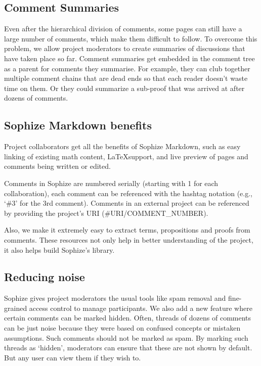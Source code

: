 \documentclass[a4paper]{article}
\begin{document}
\subsection{Comment Summaries}

Even after the hierarchical division of comments, some pages can still have a large number of comments, which make them difficult to follow. To overcome this problem, we allow project moderators to create summaries of discussions that have taken place so far. Comment summaries get embedded in the comment tree as a parent for comments they summarise. For example, they can club together multiple comment chains that are dead ends so that each reader doesn't waste time on them. Or they could summarize a sub-proof that was arrived at after dozens of comments.


\subsection{Sophize Markdown benefits}

Project collaborators get all the benefits of Sophize Markdown, such as easy linking of existing math content, \LaTeX\space support, and live preview of pages and comments being written or edited.


Comments in Sophize are numbered serially (starting with 1 for each collaboration), each comment can be referenced with the hashtag notation (e.g., `\#3' for the 3rd comment). Comments in an external project can be referenced by providing the project's URI (\#URI/COMMENT\_NUMBER).

Also, we make it extremely easy to extract terms, propositions and proofs from comments. These resources not only help in better understanding of the project, it also helps build Sophize's library.


\subsection{Reducing noise}

Sophize gives project moderators the usual tools like spam removal and fine-grained access control to manage participants. We also add a new feature where certain comments can be marked hidden. Often, threads of dozens of comments can be just noise because they were based on confused concepts or mistaken assumptions. Such comments should not be marked as spam. By marking such threads as `hidden', moderators can ensure that these are not shown by default. But any user can view them if they wish to.
\end{document}
